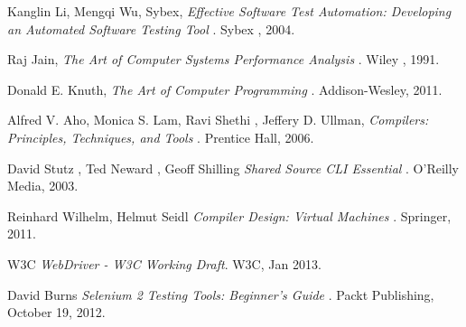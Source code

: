 \begin{thebibliography}{9}

   Kanglin Li, Mengqi Wu, Sybex,
   \emph{ Effective Software Test Automation: Developing an Automated Software Testing Tool  }.
   Sybex ,
   2004.

   Raj Jain,
   \emph{ The Art of Computer Systems Performance Analysis }.
   Wiley ,
   1991.

   Donald E. Knuth,
   \emph{ The Art of Computer Programming  }.
   Addison-Wesley,
   2011.


   Alfred V. Aho, Monica S. Lam, Ravi Shethi , Jeffery D. Ullman,
   \emph{ Compilers: Principles, Techniques, and Tools  }.
   Prentice Hall,
   2006.

    David Stutz , Ted Neward , Geoff Shilling
   \emph{ Shared Source CLI Essential  }.
   O'Reilly Media,
   2003.

   Reinhard Wilhelm, Helmut Seidl
   \emph{ Compiler Design: Virtual Machines  }.
   Springer,
   2011.

   W3C
   \emph{ WebDriver - W3C Working Draft}.
   W3C,
   Jan 2013.

   David Burns
   \emph{ Selenium 2 Testing Tools: Beginner's Guide }.
    Packt Publishing, 
   October 19, 2012.


\end{thebibliography}